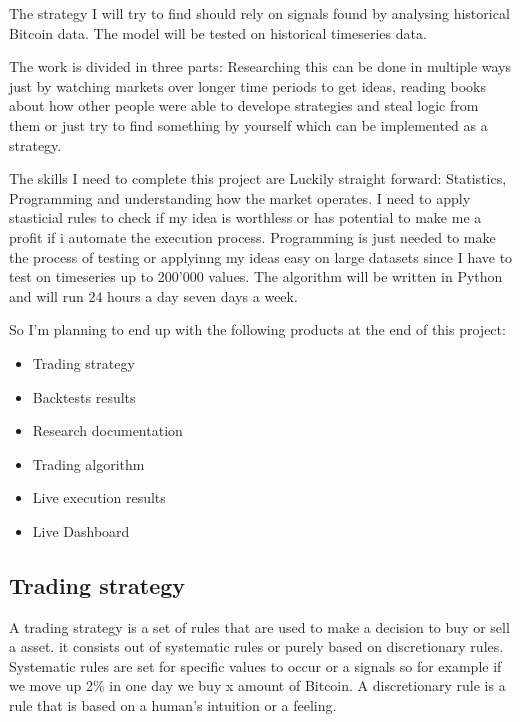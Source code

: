 \documentclass[12pt]{article}
\begin{document}
The strategy I will try to find should rely on  signals found by analysing historical Bitcoin data. The model will be tested on historical timeseries data.

The work is divided in three parts: Researching this can be done in multiple ways just by watching markets over longer time periods to get ideas, reading books about how other people were able to develope strategies and steal logic from them or just try to find something by yourself which can be implemented as a strategy.



The skills I need to complete this project are Luckily straight forward: Statistics, Programming and understanding how the market operates. I need to apply stasticial rules to check if my idea is worthless or has potential to make me a profit if i automate the execution process. Programming is just needed to make the process of testing or applyinng my ideas easy on large datasets since I have to test on timeseries up to 200'000 values. The algorithm will be written in Python and will run 24 hours a day seven days a week.





So I'm planning to end up with the following products at the end of this project:

\begin{itemize}
    \item Trading strategy
    \item Backtests results
    \item Research documentation
    \item Trading algorithm
    \item Live execution results
    \item Live Dashboard

\end{itemize}



\subsection{Trading strategy}
A trading strategy is a set of rules that are used to make a decision to buy or sell a asset. it consists out of systematic rules or purely based on discretionary rules.
Systematic rules are set for specific values to occur or a signals so for example if we move up 2\% in one day we buy x amount of Bitcoin. A discretionary rule is a rule that is based on a human's intuition or a feeling.
\end{document}
